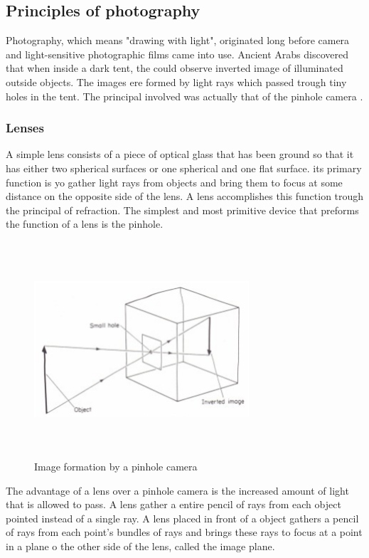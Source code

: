 \subsection{Principles of photography}
Photography, which means "drawing with light", originated long before camera and light-sensitive photographic films came into use. Ancient Arabs discovered that when inside a dark tent, the could observe inverted image of illuminated outside objects. The images ere formed by light rays which passed trough tiny holes in the tent. The principal involved was actually that of the pinhole camera  \cite{elements_photogrammetry}.
\subsubsection{Lenses}
A simple lens consists of a piece of optical glass that has been ground so that it has either two spherical surfaces or one spherical and one flat surface. its primary function is yo gather light rays from objects and bring them to focus at some distance on the opposite side of the lens. A lens accomplishes this function trough the principal of refraction. The simplest and most primitive device that preforms the function of a lens is the pinhole.\cite{elements_photogrammetry}
\begin{figure}[H]
\centering
\includegraphics[width=8cm,height=8cm,keepaspectratio]{imagenes/pinhole.PNG}
\caption{Image formation by a pinhole camera }
\label{fig:pinhole}
\end{figure}
The advantage of a lens over a pinhole camera is the increased amount of light that is allowed to pass. A lens gather a entire pencil of rays from each object pointed instead of a single ray. A lens placed in front of a object gathers a pencil of rays from each point's bundles of rays and brings these rays to focus at a point in a plane o the other side of the lens, called the image plane\cite{elements_photogrammetry}.
